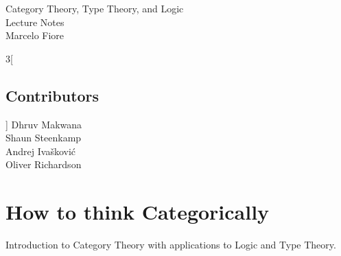 \setlength\parindent{0pt}
\setlength\parskip{0.7em}

\newcommand {\cat}{%
    \mathbf%
}
\newcommand {\domain}[1] {%
    \mathrm{dom}(#1)%
}
\newcommand {\codomain}[1] {%
    \mathrm{cod}(#1)%
}
\newcommand {\idarrow}[1][] {%
    \mathbf{1}{#1}%
}
\newcommand {\Cat}{%
    \cat {Cat}%
}
\newcommand {\Mon}{%
    \cat {Mon}%
}
\newcommand {\Poset}{%
    \cat {Poset}%
}
\newcommand {\Rel}{%
    \cat {Rel}%
}
\newcommand {\Sets}{%
    \cat {Sets}%
}
\newcommand {\Groups}{%
    \cat {Groups}%
}
\newcommand {\Graphs}{%
    \cat {Graphs}%
}

\newcommand{\ie}{\emph{i.e.}}

\newcommand{\eqdef}{\stackrel{\text{def}}{=}} %
\newcommand{\comp}{\circ} %
\newcommand{\icomp}{\,} %

\newcommand{\setof}[1]{ \{ #1 \} }
\newcommand{\bigsetof}[1]{ \big\{ #1 \big\} }
\newcommand{\suchthat}{\mid}
\newcommand{\union}{\cup}

\newcommand{\nelem}[1]{ \mathbf{ #1 } }
\newcommand{\id}[1]{ \mathrm{id}_{ #1 } }
\newcommand{\nats}{\mathbb{N}}



\begin{center} {\huge \sc
Category Theory, Type Theory, and Logic\\
  Lecture Notes\\[4mm]}
  \Large Marcelo Fiore
\end{center}


\begin{multicols}{3}[\section*{Contributors}]
Dhruv Makwana\\ 
Shaun Steenkamp\\
Andrej Ivašković\\
Oliver Richardson
\end{multicols}
\clearpage


\tableofcontents

\newpage
\chapter{How to think Categorically}

Introduction to Category Theory with applications to Logic and Type Theory.

